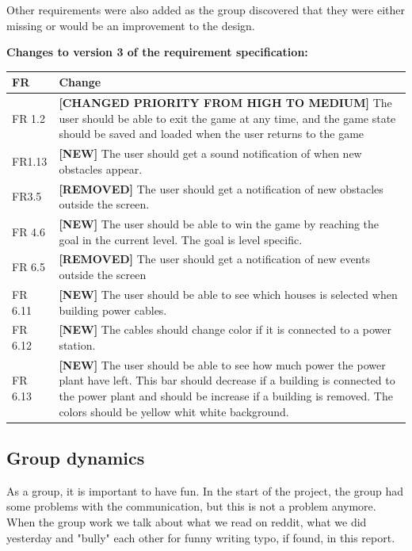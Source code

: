 	Other requirements were also added as the group discovered that they were either missing or would be an improvement to the design.
	
	{\bf Changes to version 3 of the requirement specification:} \\
	\begin{tabular}{| p{1.5cm} | p{12cm} |}
		\hline
		\rowcolor{lightgray}
		{\bf FR} & {\bf Change} \\ \hline
		FR 1.2 & {\bf \color{orange}[CHANGED PRIORITY FROM HIGH TO MEDIUM]} The user should be able 
		to exit the game at any time, and the game state should be saved and loaded when the user 
		returns to the game \\ \hline
		FR1.13 & {\bf \color{green}[NEW]} The user should get a sound notification of when new obstacles appear. \\ \hline
		FR3.5 & {\bf \color{red}[REMOVED]}  The user should get a notification of new obstacles outside the screen. \\ \hline
		FR 4.6 & {\bf \color{green}[NEW]} The user should be able to win the game by reaching the goal in the current level. The goal is level specific. \\ \hline
		FR 6.5 & {\bf \color{red}[REMOVED]} The user should get a notification of new events outside 
		the screen \\ \hline
		FR 6.11 & {\bf \color{green}[NEW]} The user should be able to see which houses is selected when building power cables. \\ \hline
		FR 6.12 & {\bf \color{green}[NEW]} The cables should change color if it is connected to a power 
		station. \\ \hline
		FR 6.13 & {\bf \color{green}[NEW]} The user should be able to see how much power the 
		power plant have left. This bar should decrease if a building is connected to the power plant 
		and should be increase if a building is removed. The colors should be yellow whit white 
		background. \\ \hline
	\end{tabular}


\subsection{Group dynamics}
	As a group, it is important to have fun. In the start of the project, the group had some
	problems with the communication, but this is not a problem anymore.
	When the group work we talk about what we read on reddit, what we did yesterday and 
	"bully" each other for funny writing typo, if found, in this report. 

